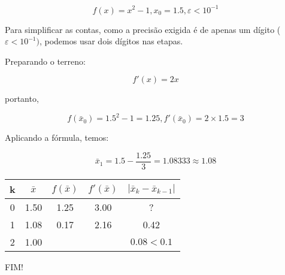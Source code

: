 \documentclass[a4paper]{article}
\begin{document}
\begin{displaymath}
  f(x) = x^2 -1, x_0 = 1.5, \varepsilon <10^{-1}
\end{displaymath}

Para simplificar as contas, como a precisão exigida é de apenas um
dígito ($\varepsilon <10^{-1})$, podemos usar dois dígitos nas etapas.

Preparando o terreno:

\begin{displaymath}
  f'(x) = 2x
\end{displaymath}

portanto,

\begin{displaymath}
  f(\bar{x}_0) = 1.5^2-1 = 1.25, f'(\bar{x}_0) = 2 \times 1.5 = 3
\end{displaymath}

Aplicando a fórmula, temos:

\begin{displaymath}
  \bar{x}_1 = 1.5 - \frac{1.25}{3} = 1.08333 \approx 1.08
\end{displaymath}

\begin{center}
  \begin{tabular}{c|c|c|c|c}
    k & $\bar{x}$ & $f(\bar{x})$ & $f'(\bar{x})$ & $|\bar{x}_k - \bar{x}_{k-1}|$\\
    \hline
    0 & 1.50 & 1.25 & 3.00 & ? \\
    \hline
    1 & 1.08 & 0.17 & 2.16 & 0.42 \\
    \hline
    2 & 1.00 &  &  & $0.08 < 0.1$ \\
  \end{tabular}
\end{center}

FIM!
\end{document}
